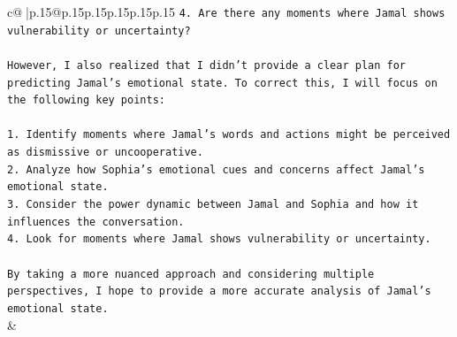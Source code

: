 \documentclass{article}
\begin{document}
{\begin{supertabular}{c@{$\;$}|p{.15\linewidth}@{}p{.15\linewidth}p{.15\linewidth}p{.15\linewidth}p{.15\linewidth}p{.15\linewidth}}
{{{\texttt{4. Are there any moments where Jamal shows vulnerability or uncertainty?} \\
\\ 
\texttt{However, I also realized that I didn't provide a clear plan for predicting Jamal's emotional state. To correct this, I will focus on the following key points:} \\
\\ 
\texttt{1. Identify moments where Jamal's words and actions might be perceived as dismissive or uncooperative.} \\
\texttt{2. Analyze how Sophia's emotional cues and concerns affect Jamal's emotional state.} \\
\texttt{3. Consider the power dynamic between Jamal and Sophia and how it influences the conversation.} \\
\texttt{4. Look for moments where Jamal shows vulnerability or uncertainty.} \\
\\ 
\texttt{By taking a more nuanced approach and considering multiple perspectives, I hope to provide a more accurate analysis of Jamal's emotional state.} \\
            }
        }
    }
    & \\ \\

\end{supertabular}
}
\end{document}
